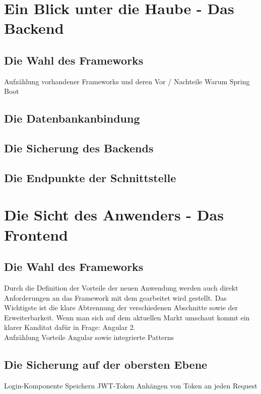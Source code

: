\chapter{Ein Blick unter die Haube - Das Backend}

\section{Die Wahl des Frameworks}

Aufzählung vorhandener Frameworks und deren Vor / Nachteile
Warum Spring Boot

\section{Die Datenbankanbindung}

\section{Die Sicherung des Backends}


\section{Die Endpunkte der Schnittstelle}


\chapter{Die Sicht des Anwenders - Das Frontend}

\section{Die Wahl des Frameworks}

Durch die Definition der Vorteile der neuen Anwendung werden auch direkt Anforderungen an das Framework mit dem gearbeitet wird gestellt. Das Wichtigste ist die klare Abtrennung der verschiedenen Abschnitte sowie der Erweiterbarkeit. Wenn man sich auf dem aktuellen Markt umschaut kommt ein klarer Kanditat dafür in Frage: Angular 2. \\
Aufzählung Vorteile Angular sowie integrierte Patterns

\section{Die Sicherung auf der obersten Ebene}

Login-Komponente
Speichern JWT-Token
Anhängen von Token an jeden Request

